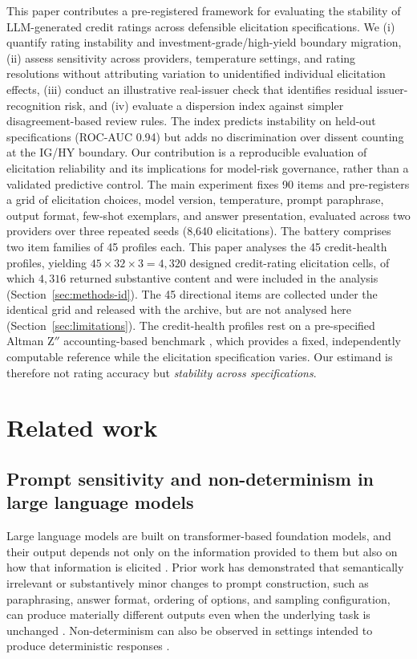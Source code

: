 \documentclass[a4paper,fleqn]{cas-sc}
\begin{document}
This paper contributes a pre-registered framework for evaluating the stability of LLM-generated
credit ratings across defensible elicitation specifications. We (i) quantify rating instability and
investment-grade/high-yield boundary migration, (ii) assess sensitivity across providers,
temperature settings, and rating resolutions without attributing variation to unidentified
individual elicitation effects, (iii) conduct an illustrative real-issuer check that identifies
residual issuer-recognition risk, and (iv) evaluate a dispersion index against simpler
disagreement-based review rules. The index predicts instability on held-out specifications
(ROC-AUC 0.94) but adds no discrimination over dissent counting at the IG/HY boundary. Our
contribution is a reproducible evaluation of elicitation reliability and its implications for
model-risk governance, rather than a validated predictive control.
The main experiment fixes 90 items and pre-registers a grid of elicitation choices, model version,
temperature, prompt paraphrase, output format, few-shot exemplars, and answer presentation, evaluated
across two providers over three repeated seeds (8{,}640 elicitations). The battery comprises two
item families of 45 profiles each. This paper analyses the 45 credit-health profiles, yielding $45\times32\times3=4{,}320$ designed credit-rating elicitation cells, of which $4{,}316$ returned substantive content and were included in the analysis (Section~\ref{sec:methods-id}). The 45 directional items are collected under the identical grid and
released with the archive, but are not analysed here (Section~\ref{sec:limitations}). The credit-health profiles rest on a pre-specified Altman Z$''$ accounting-based benchmark \citep{altman2005ems,altmanhotchkiss2006}, which provides a fixed, independently computable reference while the elicitation specification varies. Our estimand is therefore
not rating accuracy but \emph{stability across specifications}.

\section{Related work}
\subsection{Prompt sensitivity and non-determinism in large language models}
Large language models are built on transformer-based foundation models, and their output depends not only
on the information provided to them but also on how that information is elicited
\citep{vaswani2017attention,devlin2019bert,bommasani2021foundation}. Prior work has demonstrated that
semantically irrelevant or substantively minor changes to prompt construction, such as paraphrasing,
answer format, ordering of options, and sampling configuration, can produce materially different outputs
even when the underlying task is unchanged \citep{atil2024nondeterminism,sclar2024formatspread}.
Non-determinism can also be observed in settings intended to produce deterministic responses
\citep{atil2024nondeterminism}.
\end{document}
